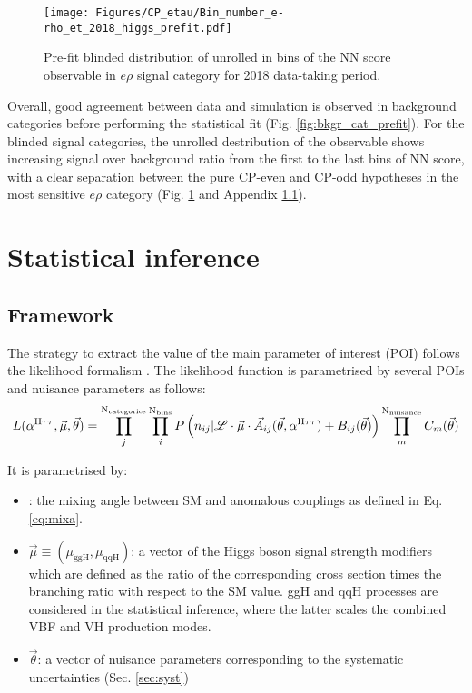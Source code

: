 \begin{figure}[h!]
    \centering
    \texttt{[image: Figures/CP\_etau/Bin\_number\_e-rho\_et\_2018\_higgs\_prefit.pdf]}
    \caption{Pre-fit blinded distribution of unrolled in bins of the NN score \phicp observable in $e\rho$ signal category for 2018 data-taking period.}
    \label{fig:sig_cat_prefit}
\end{figure}

Overall, good agreement between data and simulation is observed in background categories before performing the statistical fit (Fig. \ref{fig:bkgr_cat_prefit}). For the blinded signal categories, the unrolled destribution of the \phicp observable shows increasing signal over background ratio from the first to the last bins of NN score, with a clear separation between the pure CP-even and CP-odd hypotheses in the most sensitive $e\rho$ category (Fig. \ref{fig:sig_cat_prefit} and Appendix \ref{}).

\section{Statistical inference}\label{sec:stat}
\subsection{Framework}
The strategy to extract the value of the main parameter of interest (POI) \mixa follows the likelihood formalism \cite{Conway:2011in, ATLAS:2011tau, CMS:2014fzn}. The likelihood function is parametrised by several POIs and nuisance parameters as follows: 
\begin{equation}\label{eq:like}
    L(\alpha^{\text{H}\tau\tau}, \vec{\mu}, \vec{\theta}) = \prod_j^{\text{N}_\text{categories}}\prod_i^{\text{N}_\text{bins}} P\left(n_{ij}|\mathcal{L} \cdot \vec{\mu} \cdot \vec{A}_{ij}(\vec{\theta}, \alpha^{\text{H}\tau\tau}) + B_{ij}(\vec{\theta})\right) \prod_m^{\text{N}_\text{nuisance}}C_m(\vec{\theta})
\end{equation}

It is parametrised by:
\begin{itemize}
    \item \mixa: the mixing angle between SM and anomalous couplings as defined in Eq. \ref{eq:mixa}.
    
    \item $\vec{\mu} \equiv (\mu_\text{ggH}, \mu_\text{qqH})$: a vector of the Higgs boson signal strength modifiers which are defined as the ratio of the corresponding cross section times the \htt branching ratio with respect to the SM value. ggH and qqH processes are considered in the statistical inference, where the latter scales the combined VBF and VH production modes.
    
    \item $\vec{\theta}$: a vector of nuisance parameters corresponding to the systematic uncertainties (Sec. \ref{sec:syst})
    
\end{itemize}


